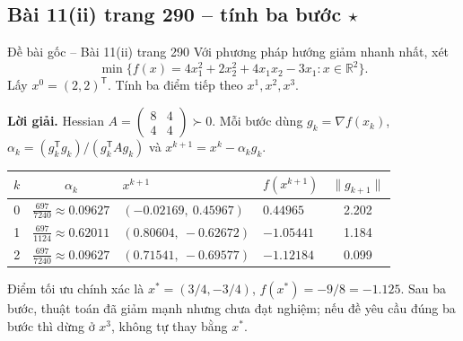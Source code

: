 \documentclass[11pt,a4paper]{article}
\newcommand{\R}{\mathbb{R}}
\newcommand{\grad}{\nabla}
\newcommand{\T}{^{\mathsf T}}
\begin{document}
\subsection{Bài 11(ii) trang 290 -- tính ba bước \(\star\)}
\begin{questionbox}{Đề bài gốc -- Bài 11(ii) trang 290}
Với phương pháp hướng giảm nhanh nhất, xét
\[
\min\{f(x)=4x_1^2+2x_2^2+4x_1x_2-3x_1:x\in\R^2\}.
\]
Lấy \(x^0=(2,2)\T\). Tính ba điểm tiếp theo \(x^1,x^2,x^3\).
\end{questionbox}
\textbf{Lời giải.} Hessian \(A=\begin{pmatrix}8&4\\4&4\end{pmatrix}\succ0\). Mỗi bước dùng \(g_k=\grad f(x_k)\), \(\alpha_k=(g_k\T g_k)/(g_k\T Ag_k)\) và \(x^{k+1}=x^k-\alpha_kg_k\).
\begin{center}
\begin{tabularx}{.96\textwidth}{c c Y Y c}
\toprule
\(k\) & \(\alpha_k\) & \(x^{k+1}\) & \(f(x^{k+1})\) & \(\|g_{k+1}\|\)\\
 & \(\frac{697}{7240}\approx0.09627\) & \((-0.02169,\ 0.45967)\) & \(0.44965\) & 2.202\\
1 & \(\frac{697}{1124}\approx0.62011\) & \((0.80604,\ -0.62672)\) & \(-1.05441\) & 1.184\\
2 & \(\frac{697}{7240}\approx0.09627\) & \((0.71541,\ -0.69577)\) & \(-1.12184\) & 0.099\\
\bottomrule
\end{tabularx}
\end{center}
Điểm tối ưu chính xác là \(x^\ast=(3/4,-3/4)\), \(f(x^\ast)=-9/8=-1.125\). Sau ba bước, thuật toán đã giảm mạnh nhưng chưa đạt nghiệm; nếu đề yêu cầu đúng ba bước thì dừng ở \(x^3\), không tự thay bằng \(x^\ast\).

\end{document}
